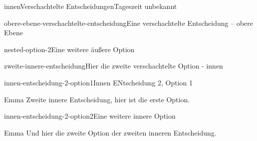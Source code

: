 \documentclass[12pt]{article}
\begin{document}
\begin{scene}{innen}{Verschachtelte Entscheidungen}{Tageszeit unbekannt}
\begin{decision}{obere-ebene-verschachtelte-entscheidung}{Eine verschachtelte Entscheidung -- obere Ebene}
\begin{option}{nested-option-2}{Eine weitere äußere Option}
\begin{decision}{zweite-innere-entscheidung}{Hier die zweite verschachtelte Option - innen}
                    \begin{option}{innen-entscheidung-2-option1}{Innen ENtscheidung 2, Option 1}
                        \begin{dialog}{Emma}
                            Zweite innere Entscheidung, hier ist die erste Option.
                        \end{dialog}
                    \end{option}
                    \begin{option}{innen-entscheidung-2-option2}{Eine weitere innere Option}
                        \begin{dialog}{Emma}
                            Und hier die zweite Option der zweiten inneren Entscheidung.
                        \end{dialog}
                    \end{option}
                \end{decision}
            \end{option}
        \end{decision}
    \end{scene}
\end{document}
